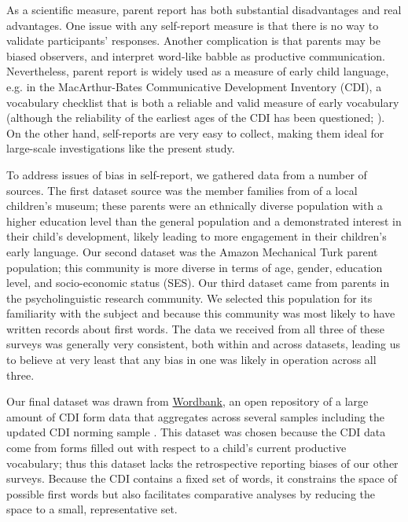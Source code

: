 \documentclass[10pt,letterpaper]{article}
\begin{document}
As a scientific measure, parent report has both substantial disadvantages and real advantages. One issue with any self-report measure is that there is no way to validate participants' responses. Another complication is that parents may be biased observers, and interpret word-like babble as productive communication. Nevertheless, parent report is widely used as a measure of early child language, e.g. in the MacArthur-Bates Communicative Development Inventory (CDI), a vocabulary checklist that is both a reliable and valid measure of early vocabulary \cite{fenson1994,fenson2007} (although the reliability of the earliest ages of the CDI has been questioned; ). On the other hand, self-reports are very easy to collect, making them ideal for large-scale investigations like the present study. 

To address issues of bias in self-report, we gathered data from a number of sources. The first dataset source was the member families from of a local children's museum; these parents were an ethnically diverse population with a higher education level than the general population and a demonstrated interest in their child's development, likely leading to more engagement in their children's early language. Our second dataset was the Amazon Mechanical Turk parent population; this community is more diverse in terms of age, gender, education level, and socio-economic status (SES). Our third dataset came from parents in the psycholinguistic research community. We selected this population for its familiarity with the subject and because this community was most likely to have written records about first words. The data we received from all three of these surveys was generally very consistent, both within and across datasets, leading us to believe at very least that any bias in one was likely in operation across all three. 

Our final dataset was drawn from \href{http://wordbank.stanford.edu}{Wordbank}, an open repository of a large amount of CDI form data that aggregates across several samples including the updated CDI norming sample \cite{fenson2007}. This dataset was chosen because the CDI data come from forms filled out with respect to a child's current productive vocabulary; thus this dataset lacks the retrospective reporting biases of our other surveys. Because the CDI contains a fixed set of words, it constrains the space of possible first words but also facilitates comparative analyses by reducing the space to a small, representative set.
\end{document}
